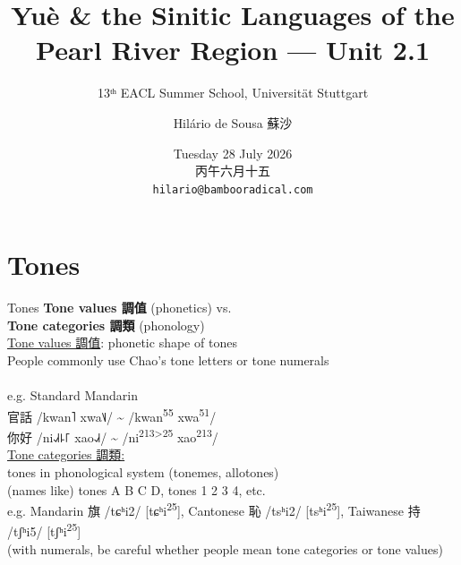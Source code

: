 \documentclass{beamer}
\title[Pearl River Sinitic]{Yuè \& the Sinitic Languages of the Pearl River Region --- Unit 2.1}
\subtitle{13ᵗʰ EACL Summer School, Universität Stuttgart}
\author{Hilário de Sousa 蘇沙}
\institute{EHESS–CRLAO \\ {\tiny membre associé}}
\date{Tuesday 28 July 2026 \\ 丙午六月十五 \\ {\footnotesize \texttt{hilario@bambooradical.com}}}
\begin{document}
\begin{frame}
  \titlepage
\end{frame}

\section{Tones}

\begin{frame}[fragile]{Tones}
\textbf{Tone values 調值} (phonetics) vs.\\ \quad \textbf{Tone categories 調類} (phonology)\\
\bigskip
\underline{Tone values 調值}: phonetic shape of tones 
\\People commonly use Chao's tone letters or tone numerals\\
\\
e.g. Standard Mandarin\\ 
官話 /kwan˥ xwa˥˩/ \textasciitilde{} /kwan\textsuperscript{55} xwa\textsuperscript{51}/\\
你好 /ni˨˩˧꜕꜒ xao˨˩˧/ \textasciitilde{} /ni\textsuperscript{213>25} xao\textsuperscript{213}/\\
\medskip
\underline{Tone categories 調類:}\\ tones in phonological system {\footnotesize (tonemes, allotones)}\\
{\footnotesize (names like)} tones A B C D, tones 1 2 3 4, etc.\\
e.g. Mandarin 旗 /tɕʰi2/ [tɕʰi\textsuperscript{25}], Cantonese 恥 /tsʰi2/ [tsʰi\textsuperscript{25}], Taiwanese 持 /tʃʰi5/ [tʃʰi\textsuperscript{25}]\\
{\scriptsize (with numerals, be careful whether people mean tone categories or tone values)}\\
\end{frame}
\end{document}
